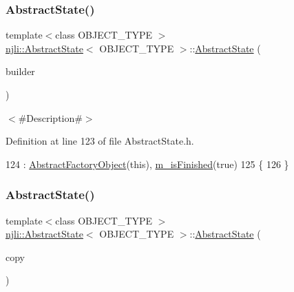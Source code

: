 \subsubsection{\texorpdfstring{Abstract\+State()}{AbstractState()}\hspace{0.1cm}{\footnotesize\ttfamily [2/3]}}
{\footnotesize\ttfamily template$<$class O\+B\+J\+E\+C\+T\+\_\+\+T\+Y\+PE $>$ \\
\mbox{\hyperlink{classnjli_1_1_abstract_state}{njli\+::\+Abstract\+State}}$<$ O\+B\+J\+E\+C\+T\+\_\+\+T\+Y\+PE $>$\+::\mbox{\hyperlink{classnjli_1_1_abstract_state}{Abstract\+State}} (\begin{DoxyParamCaption}\item[{const \mbox{\hyperlink{classnjli_1_1_abstract_builder}{Abstract\+Builder}} \&}]{builder }\end{DoxyParamCaption})}

$<$\#\+Description\#$>$ 

Definition at line 123 of file Abstract\+State.\+h.


\begin{DoxyCode}
124       : \mbox{\hyperlink{classnjli_1_1_abstract_factory_object_a4f7ae7bf09c7c9426e7d6023f7fd8dec}{AbstractFactoryObject}}(\textcolor{keyword}{this}), \mbox{\hyperlink{classnjli_1_1_abstract_state_a445a5d1ac7572b8b01b81937c89e960c}{m\_isFinished}}(\textcolor{keyword}{true})
125   \{
126   \}
\end{DoxyCode}
\mbox{\label{classnjli_1_1_abstract_state_a0b92c7b010d060a03395ac5874c77019}} 
\subsubsection{\texorpdfstring{Abstract\+State()}{AbstractState()}\hspace{0.1cm}{\footnotesize\ttfamily [3/3]}}
{\footnotesize\ttfamily template$<$class O\+B\+J\+E\+C\+T\+\_\+\+T\+Y\+PE $>$ \\
\mbox{\hyperlink{classnjli_1_1_abstract_state}{njli\+::\+Abstract\+State}}$<$ O\+B\+J\+E\+C\+T\+\_\+\+T\+Y\+PE $>$\+::\mbox{\hyperlink{classnjli_1_1_abstract_state}{Abstract\+State}} (\begin{DoxyParamCaption}\item[{const \mbox{\hyperlink{classnjli_1_1_abstract_state}{Abstract\+State}}$<$ O\+B\+J\+E\+C\+T\+\_\+\+T\+Y\+PE $>$ \&}]{copy }\end{DoxyParamCaption})}


